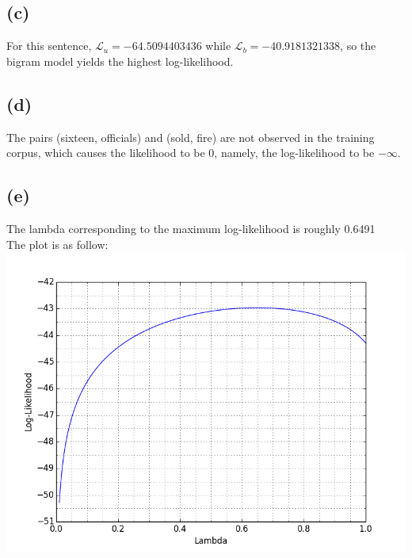 \documentclass [11pt, a4paper, oneside] {article}
\begin{document}
\subsection *{(c)}
For this sentence, $\mathcal{L}_u = -64.5094403436$ while $\mathcal{L}_b = -40.9181321338$, so the bigram model yields the highest log-likelihood.\\
\subsection *{(d)}
The pairs (sixteen, officials) and (sold, fire) are not observed in the training corpus, which causes the  likelihood to be 0, namely, the log-likelihood to be $-\infty$.\\
\subsection *{(e)}
The lambda corresponding to the maximum log-likelihood is roughly 0.6491\\
The plot is as follow:\\
\includegraphics[height=10cm]{35e.png}
\end{document}
